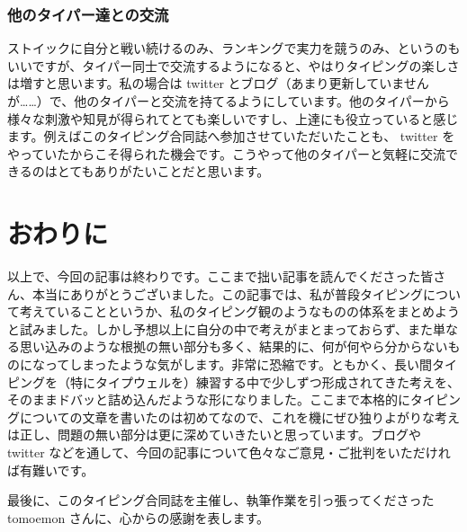 \subsubsection*{他のタイパー達との交流}

ストイックに自分と戦い続けるのみ、ランキングで実力を競うのみ、というのもいいですが、タイパー同士で交流するようになると、やはりタイピングの楽しさは増すと思います。私の場合は twitter とブログ（あまり更新していませんが……）で、他のタイパーと交流を持てるようにしています。他のタイパーから様々な刺激や知見が得られてとても楽しいですし、上達にも役立っていると感じます。例えばこのタイピング合同誌へ参加させていただいたことも、 twitter をやっていたからこそ得られた機会です。こうやって他のタイパーと気軽に交流できるのはとてもありがたいことだと思います。

\section{おわりに}

以上で、今回の記事は終わりです。ここまで拙い記事を読んでくださった皆さん、本当にありがとうございました。この記事では、私が普段タイピングについて考えていることというか、私のタイピング観のようなものの体系をまとめようと試みました。しかし予想以上に自分の中で考えがまとまっておらず、また単なる思い込みのような根拠の無い部分も多く、結果的に、何が何やら分からないものになってしまったような気がします。非常に恐縮です。ともかく、長い間タイピングを（特にタイプウェルを）練習する中で少しずつ形成されてきた考えを、そのままドバッと詰め込んだような形になりました。ここまで本格的にタイピングについての文章を書いたのは初めてなので、これを機にぜひ独りよがりな考えは正し、問題の無い部分は更に深めていきたいと思っています。ブログや twitter などを通して、今回の記事について色々なご意見・ご批判をいただければ有難いです。

最後に、このタイピング合同誌を主催し、執筆作業を引っ張ってくださった tomoemon さんに、心からの感謝を表します。
